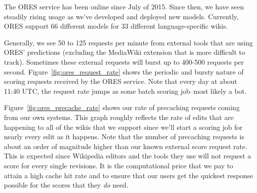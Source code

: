 The ORES service has been online since July of 2015\cite{halfaker2015artificial}.  Since then, we have seen steadily rising usage as we've developed and deployed new models.  Currently, ORES support 66 different models for 33 different language-specific wikis.

Generally, we see 50 to 125 requests per minute from external tools that are using ORES' predictions (excluding the MediaWiki extension that is more difficult to track).  Sometimes these external requests will burst up to 400-500 requests per second.  Figure~\ref{fig:ores_request_rate} shows the periodic and bursty nature of scoring requests received by the ORES service.  Note that every day at about 11:40 UTC, the request rate jumps as some batch scoring job--most likely a bot.

Figure~\ref{fig:ores_precache_rate} shows our rate of precaching requests coming from our own systems.  This graph roughly reflects the rate of edits that are happening to all of the wikis that we support since we'll start a scoring job for nearly every edit as it happens.  Note that the number of precaching requests is about an order of magnitude higher than our known external score request rate.  This is expected since Wikipedia editors and the tools they use will not request a score for every single revisions.  It is the computational price that we pay to attain a high cache hit rate and to ensure that our users get the quickest response possible for the scores that they \emph{do} need.

